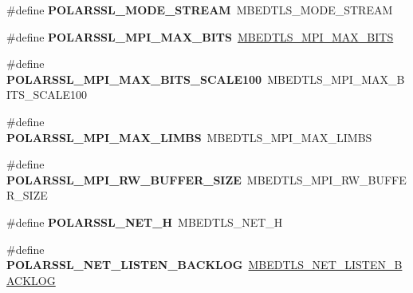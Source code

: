 \begin{DoxyCompactItemize}
\item 
\mbox{\label{compat-1_83_8h_aad99da49651dff6a53c3a75bf577209e}} 
\#define {\bfseries P\+O\+L\+A\+R\+S\+S\+L\+\_\+\+M\+O\+D\+E\+\_\+\+S\+T\+R\+E\+AM}~M\+B\+E\+D\+T\+L\+S\+\_\+\+M\+O\+D\+E\+\_\+\+S\+T\+R\+E\+AM
\item 
\mbox{\label{compat-1_83_8h_aca6ca30059eab25954ebb962a8b69c52}} 
\#define {\bfseries P\+O\+L\+A\+R\+S\+S\+L\+\_\+\+M\+P\+I\+\_\+\+M\+A\+X\+\_\+\+B\+I\+TS}~\mbox{\hyperlink{bignum_8h_a134ba62182ca105e273d465861f5a4d5}{M\+B\+E\+D\+T\+L\+S\+\_\+\+M\+P\+I\+\_\+\+M\+A\+X\+\_\+\+B\+I\+TS}}
\item 
\mbox{\label{compat-1_83_8h_ac2146744fdaa3abf5ee13918c2d5268b}} 
\#define {\bfseries P\+O\+L\+A\+R\+S\+S\+L\+\_\+\+M\+P\+I\+\_\+\+M\+A\+X\+\_\+\+B\+I\+T\+S\+\_\+\+S\+C\+A\+L\+E100}~M\+B\+E\+D\+T\+L\+S\+\_\+\+M\+P\+I\+\_\+\+M\+A\+X\+\_\+\+B\+I\+T\+S\+\_\+\+S\+C\+A\+L\+E100
\item 
\mbox{\label{compat-1_83_8h_a8ee0afd7c8a22f13aaa70d3c812e81f7}} 
\#define {\bfseries P\+O\+L\+A\+R\+S\+S\+L\+\_\+\+M\+P\+I\+\_\+\+M\+A\+X\+\_\+\+L\+I\+M\+BS}~M\+B\+E\+D\+T\+L\+S\+\_\+\+M\+P\+I\+\_\+\+M\+A\+X\+\_\+\+L\+I\+M\+BS
\item 
\mbox{\label{compat-1_83_8h_a728c03b4fdb0f4e9e84a5488adf1c5d0}} 
\#define {\bfseries P\+O\+L\+A\+R\+S\+S\+L\+\_\+\+M\+P\+I\+\_\+\+R\+W\+\_\+\+B\+U\+F\+F\+E\+R\+\_\+\+S\+I\+ZE}~M\+B\+E\+D\+T\+L\+S\+\_\+\+M\+P\+I\+\_\+\+R\+W\+\_\+\+B\+U\+F\+F\+E\+R\+\_\+\+S\+I\+ZE
\item 
\mbox{\label{compat-1_83_8h_a726691fe39b9ebdae2fc675a07dc71b0}} 
\#define {\bfseries P\+O\+L\+A\+R\+S\+S\+L\+\_\+\+N\+E\+T\+\_\+H}~M\+B\+E\+D\+T\+L\+S\+\_\+\+N\+E\+T\+\_\+H
\item 
\mbox{\label{compat-1_83_8h_adc2420949d7ec4d71bc892bcdb9d1875}} 
\#define {\bfseries P\+O\+L\+A\+R\+S\+S\+L\+\_\+\+N\+E\+T\+\_\+\+L\+I\+S\+T\+E\+N\+\_\+\+B\+A\+C\+K\+L\+OG}~\mbox{\hyperlink{net__sockets_8h_a28c00c358ccc381ecfc2a28f59db8bd3}{M\+B\+E\+D\+T\+L\+S\+\_\+\+N\+E\+T\+\_\+\+L\+I\+S\+T\+E\+N\+\_\+\+B\+A\+C\+K\+L\+OG}}
\item 
\mbox{\label{compat-1_83_8h_acaba14c9b04730cc71f41179e5099d35}} 

\end{DoxyCompactItemize}
